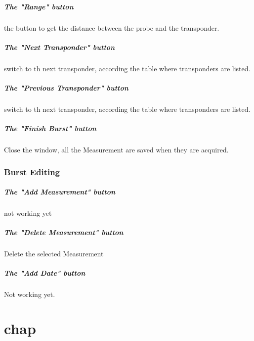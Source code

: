 \documentclass[11pt]{report}
\begin{document}
            \paragraph{The "Range" button} the button to get the distance between the probe and the transponder.
            \paragraph{The "Next Transponder" button} switch to th next transponder, according the table where transponders are listed.
            \paragraph{The "Previous Transponder" button} switch to th next transponder, according the table where transponders are listed.
            \paragraph{The "Finish Burst" button} Close the window, all the Measurement are saved when they are acquired.

        \vspace{1cm}
        \subsection{Burst Editing}
            \paragraph{The "Add Measurement" button}not working yet
            \paragraph{The "Delete Measurement" button}Delete the selected Measurement
            \paragraph{The "Add Date" button}Not working yet.




\iffalse		
\chapter{chap}
\end{document}
